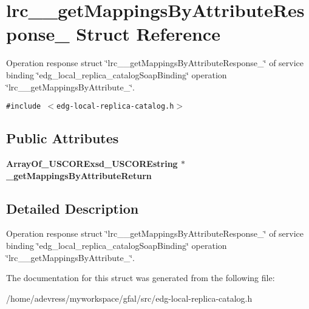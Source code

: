\section{lrc\_\-\_\-get\-Mappings\-By\-Attribute\-Response\_\- Struct Reference}
\label{structlrc____getMappingsByAttributeResponse__}
Operation response struct \char`\"{}lrc\_\-\_\-get\-Mappings\-By\-Attribute\-Response\_\-\char`\"{} of service binding \char`\"{}edg\_\-local\_\-replica\_\-catalog\-Soap\-Binding\char`\"{} operation \char`\"{}lrc\_\-\_\-get\-Mappings\-By\-Attribute\_\-\char`\"{}.  


{\tt \#include $<$edg-local-replica-catalog.h$>$}

\subsection*{Public Attributes}
\begin{CompactItemize}
\item 
\bf{Array\-Of\_\-USCORExsd\_\-USCOREstring} $\ast$ \textbf{\_\-get\-Mappings\-By\-Attribute\-Return}\label{structlrc____getMappingsByAttributeResponse___cece62188788a37cd92687b7a7363cce}

\end{CompactItemize}


\subsection{Detailed Description}
Operation response struct \char`\"{}lrc\_\-\_\-get\-Mappings\-By\-Attribute\-Response\_\-\char`\"{} of service binding \char`\"{}edg\_\-local\_\-replica\_\-catalog\-Soap\-Binding\char`\"{} operation \char`\"{}lrc\_\-\_\-get\-Mappings\-By\-Attribute\_\-\char`\"{}. 



The documentation for this struct was generated from the following file:\begin{CompactItemize}
\item 
/home/adevress/myworkspace/gfal/src/edg-local-replica-catalog.h\end{CompactItemize}
